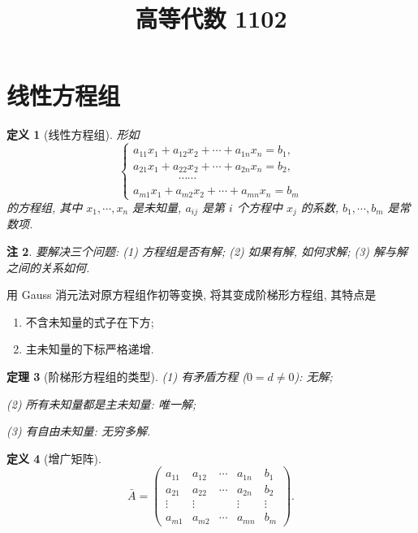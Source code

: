 \documentclass[UTF8,11pt]{ctexart}
\title{高等代数 1102}
\date{}
\theoremstyle{cnthm}
\newtheorem{thm}{定理}[section]
\newtheorem{defn}[thm]{定义}
\newtheorem{rem}[thm]{注}
\begin{document}
\maketitle

\section{线性方程组}

\begin{defn}[线性方程组]
形如
\[
\begin{cases}
a_{11}x_1 + a_{12}x_2 + \cdots + a_{1n}x_n = b_1,\\
a_{21}x_1 + a_{22}x_2 + \cdots + a_{2n}x_n = b_2,\\
\qquad\qquad \cdots\cdots\\
a_{m1}x_1 + a_{m2}x_2 + \cdots + a_{mn}x_n = b_m
\end{cases}
\]
的方程组, 其中 $x_1,\cdots,x_n$ 是未知量, $a_{ij}$ 是第 $i$ 个方程中 $x_j$ 的系数, $b_1,\cdots,b_m$ 是常数项.
\end{defn}

\begin{rem}
要解决三个问题: (1) 方程组是否有解; (2) 如果有解, 如何求解; (3) 解与解之间的关系如何.
\end{rem}

用 Gauss 消元法对原方程组作初等变换, 将其变成阶梯形方程组, 其特点是
\begin{enumerate}
\item 不含未知量的式子在下方;
\item 主未知量的下标严格递增.
\end{enumerate}

\begin{thm}[阶梯形方程组的类型]
(1) 有矛盾方程 ($0=d\neq0$): 无解;

(2) 所有未知量都是主未知量: 唯一解;

(3) 有自由未知量: 无穷多解.
\end{thm}

\begin{defn}[增广矩阵]
\[
\bar{A}=
\left(\begin{array}{cccc|c}
a_{11} & a_{12} & \cdots & a_{1n} & b_1\\
a_{21} & a_{22} & \cdots & a_{2n} & b_2\\
\vdots & \vdots & & \vdots & \vdots\\
a_{m1} & a_{m2} & \cdots & a_{mn} & b_m
\end{array}\right).
\]
\end{defn}
\end{document}
